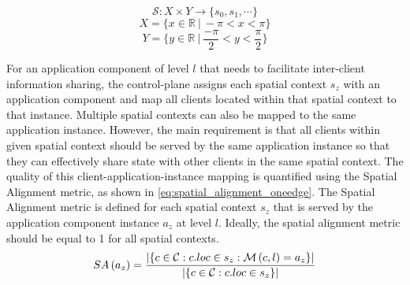 \begin{equation}
\label{eq:spatial_context}
   \mathcal{S}: X \times Y \rightarrow \{ s_0, s_1, \cdots \}
\end{equation}
\begin{equation}
   X = \{x \in \mathbb{R}~|~-\pi < x < \pi\}
\end{equation}
\begin{equation}
   Y = \{y \in \mathbb{R}~|~\dfrac{-\pi}{2} < y < \dfrac{\pi}{2}\}
\end{equation}

For an application component of level $l$ that needs to facilitate inter-client information sharing, the control-plane assigns each spatial context $s_z$ with an application component and map all clients located within that spatial context to that instance. Multiple spatial contexts can also be mapped to the same application instance. However, the main requirement is that all clients within given spatial context should be served by the same application instance so that they can effectively share state with other clients in the same spatial context. The quality of this client-application-instance mapping is quantified using the Spatial Alignment metric, as shown in \cref{eq:spatial_alignment_oneedge}. The Spatial Alignment metric is defined for each spatial context $s_z$ that is served by the application component instance $a_z$ at level $l$.  Ideally, the spatial alignment metric should be equal to 1 for all spatial contexts.
\begin{equation}
\label{eq:spatial_alignment_oneedge}
SA \left( a_z \right) = \dfrac{|\{ c \in \mathcal{C} : c.loc \in s_z  : \mathcal{M} \left( c, l\right) = a_z \}|}{|\{ c \in \mathcal{C} : c.loc \in s_z \}|}
\end{equation}

